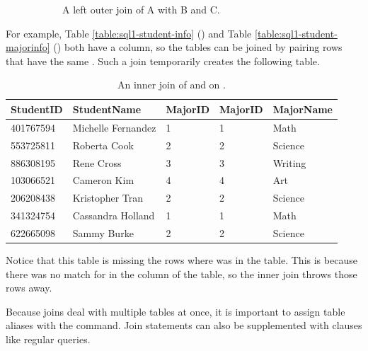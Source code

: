\begin{figure}[H]
\begin{subfigure}{.4\textwidth}
    \caption{A left outer join of A with B and C.}
    \label{fig:sql2-left-join}
\end{subfigure}
%
\caption{}
\label{fig:joins}
\end{figure}

For example, Table \ref{table:sql1-student-info} () and Table \ref{table:sql1-student-majorinfo} () both have a  column, so the tables can be joined by pairing rows that have the same .
Such a join temporarily creates the following table.

\begin{table}[H]
\centering
\footnotesize
\begin{tabular}{|l|l|l|l|l|}
    \hline StudentID & StudentName & MajorID & MajorID & MajorName \\ \hline
    401767594 & Michelle Fernandez & 1 & 1 & Math \\
    553725811 & Roberta Cook & 2 & 2 & Science \\
    886308195 & Rene Cross & 3 & 3 & Writing \\
    103066521 & Cameron Kim & 4 & 4 & Art \\
    206208438 & Kristopher Tran & 2 & 2 & Science \\
    341324754 & Cassandra Holland & 1 & 1 & Math \\
    622665098 & Sammy Burke & 2 & 2 & Science \\ \hline
\end{tabular}
\caption{An inner join of  and  on .}
\label{table:sql2-inner-join-temp}
\end{table}

Notice that this table is missing the rows where  was  in the  table.
This is because there was no match for  in the  column of the  table, so the inner join throws those rows away.

Because joins deal with multiple tables at once, it is important to assign table aliases with the  command.
Join statements can also be supplemented with  clauses like regular queries.

